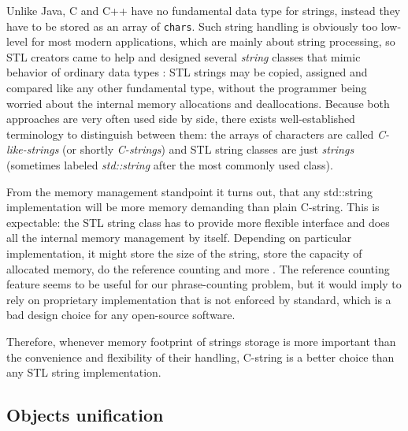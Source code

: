 Unlike Java, C and C++ have no fundamental data type for strings, instead they have
to be stored as an array of \verb|chars|.
Such string handling is obviously too low-level for most modern applications,
which are mainly about string processing, so STL creators came to help and designed
several \emph{string} classes that mimic behavior of ordinary data types
\citep[Chapter 11]{josuttis:stl}:
STL strings may be copied, assigned and compared like any other fundamental type,
without the programmer being worried about the internal memory allocations and deallocations.
Because both approaches are very often used side by side, there exists well-established
terminology to distinguish between them:
the arrays of characters are called \emph{C-like-strings} (or shortly \emph{C-strings}) and
STL string classes are just \emph{strings} (sometimes labeled \emph{std::string} after the
most commonly used class).

From the memory management standpoint it turns out, that any std::string
implementation will be more memory demanding than plain C-string.
This is expectable: the STL string class has to provide more flexible interface
and does all the internal memory management by itself.
Depending on particular implementation, it might store the size of the string,
store the capacity of allocated memory, do the reference counting and more
\citep[Item 15]{meyers:effectivestl}.
The reference counting feature seems to be useful for our phrase-counting problem,
but it would imply to rely on proprietary implementation that is not enforced by
standard, which is a bad design choice for any open-source software.

Therefore, whenever memory footprint of strings storage is more important than
the convenience and flexibility of their handling, C-string is a better choice
than any STL string implementation.

\subsection{Objects unification}
\label{sec:objects-unification}

